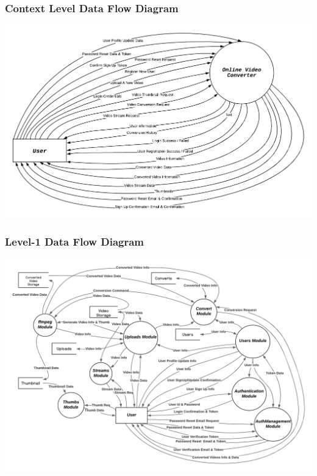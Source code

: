		\subsubsection{Context Level Data Flow Diagram}
		\begin{center}
			\includegraphics[width=24cm,angle=90]{ctx.png}
		\end{center}
		\pagebreak
		\subsubsection{Level-1 Data Flow Diagram}
		\begin{center}
			\includegraphics[width=25cm,angle=90]{dfd.png}
		\end{center}	
